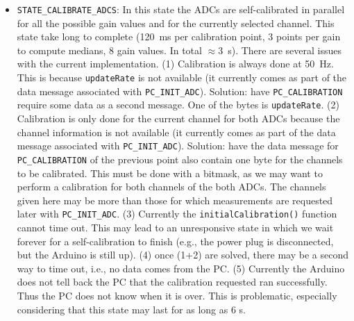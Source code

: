\documentclass[11pt,a4paper,english]{article}
\begin{document}
\begin{itemize}
\item \texttt{STATE\_CALIBRATE\_ADCS}: In this state the ADCs are self-calibrated in parallel for all the possible gain values and for the currently selected channel. This state take long to complete (120~ms per calibration point, 3 points per gain to compute medians, 8 gain values. In total $\approx3$~s). There are several issues with the current implementation. (1) Calibration is always done at 50~Hz. This is because \texttt{updateRate} is not available (it currently comes as part of the data message associated with \texttt{PC\_INIT\_ADC}). Solution: have \texttt{PC\_CALIBRATION} require some data as a second message. One of the bytes is \texttt{updateRate}. (2) Calibration is only done for the current channel for both ADCs because the channel information is not available (it currently comes as part of the data message associated with \texttt{PC\_INIT\_ADC}). Solution: have the data message for \texttt{PC\_CALIBRATION} of the previous point also contain one byte for the channels to be calibrated. This must be done with a bitmask, as we may want to perform a calibration for both channels of the both ADCs. The channels given here may be more than those for which measurements are requested later with \texttt{PC\_INIT\_ADC}. (3) Currently the \texttt{initialCalibration()} function cannot time out. This may lead to an unresponsive state in which we wait forever for a self-calibration to finish (e.g., the power plug is disconnected, but the Arduino is still up). (4) once (1+2) are solved, there may be a second way to time out, i.e., no data comes from the PC. (5) Currently the Arduino does not tell back the PC that the calibration requested ran successfully. Thus the PC does not know when it is over. This is problematic, especially considering that this state may last for as long as 6 s.

\end{itemize}
\end{document}

